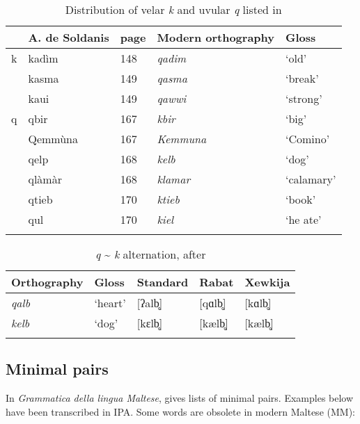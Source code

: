 \documentclass[output=paper]{langsci/langscibook}
\begin{document}
\begin{table}
 \caption{Distribution of velar \textit{k} and uvular \textit{q} listed in \citet{AgiusdeSoldanis}}
    \label{extab:puech:7}
\begin{tabular}{lllll}
\lsptoprule
& A. de Soldanis & page & Modern orthography & Gloss\\
          \midrule
  k & kadìm & 148  &\textit{qadim}&  `old'\\
    &kasma  &149  &\textit{qasma} & `break'\\
    &kaui  &149  &\textit{qawwi}  & `strong'  \\
\tablevspace
  q & qbir & 167 & \textit{kbir} & `big'  \\
    &Qemmùna & 167&  \textit{Kemmuna} & `Comino'  \\
    &qelp  &168 & \textit{kelb}  & `dog'\\
    &qlàmàr & 168&  \textit{klamar}&   `calamary'\\
    &qtieb  &170&  \textit{ktieb} & `book'\\
    &qul  &170 & \textit{kiel} & `he ate'\\
\lspbottomrule
\end{tabular}
\end{table}


\begin{table}
\caption{\textit{q} {\textasciitilde} \textit{k} alternation, after \citet{Puech1994}}
    \label{extab:puech:8}
    \begin{tabular}{lllll}
    \lsptoprule
          Orthography & Gloss & Standard & Rabat & Xewkija\\
          \midrule
 \textit{qalb}   & `heart'   & [ʔalb̥] &   [qɑlb̥]  &  [kɑlb̥]\\
  \textit{kelb}  & `dog'  &  [kɛlb̥]  &  [kælb̥]  &  [kælb̥]  \\
    \lspbottomrule
    \end{tabular}
\end{table}


\subsection{Minimal pairs}

In \textit{Grammatica della lingua Maltese}, \citet[14-15]{Vassalli1827} gives lists of minimal pairs. Examples below have been transcribed in IPA. Some words are obsolete in modern Maltese (MM):
\largerpage[2.5]
\end{document}
